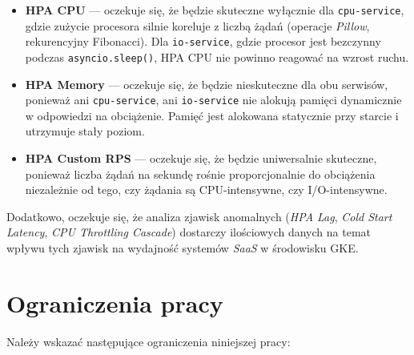 \begin{itemize}
  \item \textbf{HPA CPU} — oczekuje się, że będzie skuteczne wyłącznie dla \texttt{cpu-service}, gdzie zużycie procesora silnie koreluje z liczbą żądań (operacje \textit{Pillow}, rekurencyjny Fibonacci). Dla \texttt{io-service}, gdzie procesor jest bezczynny podczas \texttt{asyncio.sleep()}, HPA CPU nie powinno reagować na wzrost ruchu.

  \item \textbf{HPA Memory} — oczekuje się, że będzie nieskuteczne dla obu serwisów, ponieważ ani \texttt{cpu-service}, ani \texttt{io-service} nie alokują pamięci dynamicznie w odpowiedzi na obciążenie. Pamięć jest alokowana statycznie przy starcie i utrzymuje stały poziom.

  \item \textbf{HPA Custom RPS} — oczekuje się, że będzie uniwersalnie skuteczne, ponieważ liczba żądań na sekundę rośnie proporcjonalnie do obciążenia niezależnie od tego, czy żądania są CPU-intensywne, czy I/O-intensywne.
\end{itemize}

Dodatkowo, oczekuje się, że analiza zjawisk anomalnych (\textit{HPA Lag}, \textit{Cold Start Latency}, \textit{CPU Throttling Cascade}) dostarczy ilościowych danych na temat wpływu tych zjawisk na wydajność systemów \textit{SaaS} w środowisku GKE.

\section{Ograniczenia pracy}

Należy wskazać następujące ograniczenia niniejszej pracy:


